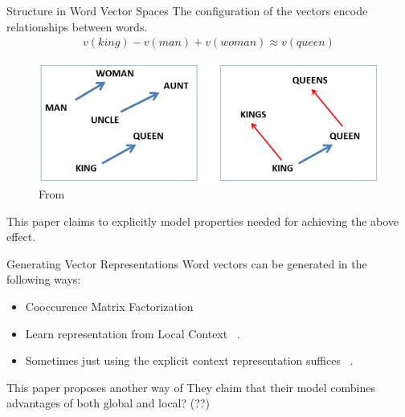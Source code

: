 \begin{frame}{Structure in Word Vector Spaces}
  The configuration of the vectors encode relationships between words.
  \begin{align*}
    v(king) - v(man) + v(woman) \approx v(queen)
  \end{align*}
    \begin{figure}
      \includegraphics[scale=0.35]{images/mikolov.png}
      \caption{From}
    \end{figure}    
  This paper claims to explicitly model properties needed for achieving the above effect.
\end{frame}

\begin{frame}{Generating Vector Representations}
  Word vectors can be generated in the following ways:
  \begin{itemize}
  \item Cooccurence Matrix Factorization~\cite{Deerwester} %
  \item Learn representation from Local Context ~\cite{Mikolov13a}.%
  \item Sometimes just using the explicit context representation suffices ~\cite{Levy14}.
  \end{itemize}
  This paper proposes another way of
  They claim that their model combines advantages of both global and local? (??)
\end{frame}

